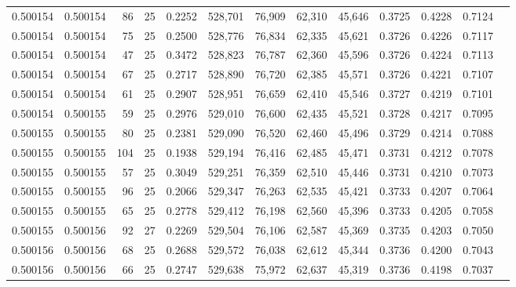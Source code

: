 \begin{tabular}{rrrrrrrrrrrrr}
0.500154 & 0.500154 &    86 &  25 &                                     0.2252 & 528,701 &  76,909 &  62,310 &  45,646 & 0.3725 & 0.4228 & 0.7124 \\
0.500154 & 0.500154 &    75 &  25 &                                     0.2500 & 528,776 &  76,834 &  62,335 &  45,621 & 0.3726 & 0.4226 & 0.7117 \\
0.500154 & 0.500154 &    47 &  25 &                                     0.3472 & 528,823 &  76,787 &  62,360 &  45,596 & 0.3726 & 0.4224 & 0.7113 \\
0.500154 & 0.500154 &    67 &  25 &                                     0.2717 & 528,890 &  76,720 &  62,385 &  45,571 & 0.3726 & 0.4221 & 0.7107 \\
0.500154 & 0.500154 &    61 &  25 &                                     0.2907 & 528,951 &  76,659 &  62,410 &  45,546 & 0.3727 & 0.4219 & 0.7101 \\
0.500154 & 0.500155 &    59 &  25 &                                     0.2976 & 529,010 &  76,600 &  62,435 &  45,521 & 0.3728 & 0.4217 & 0.7095 \\
0.500155 & 0.500155 &    80 &  25 &                                     0.2381 & 529,090 &  76,520 &  62,460 &  45,496 & 0.3729 & 0.4214 & 0.7088 \\
0.500155 & 0.500155 &   104 &  25 &                                     0.1938 & 529,194 &  76,416 &  62,485 &  45,471 & 0.3731 & 0.4212 & 0.7078 \\
0.500155 & 0.500155 &    57 &  25 &                                     0.3049 & 529,251 &  76,359 &  62,510 &  45,446 & 0.3731 & 0.4210 & 0.7073 \\
0.500155 & 0.500155 &    96 &  25 &                                     0.2066 & 529,347 &  76,263 &  62,535 &  45,421 & 0.3733 & 0.4207 & 0.7064 \\
0.500155 & 0.500155 &    65 &  25 &                                     0.2778 & 529,412 &  76,198 &  62,560 &  45,396 & 0.3733 & 0.4205 & 0.7058 \\
0.500155 & 0.500156 &    92 &  27 &                                     0.2269 & 529,504 &  76,106 &  62,587 &  45,369 & 0.3735 & 0.4203 & 0.7050 \\
0.500156 & 0.500156 &    68 &  25 &                                     0.2688 & 529,572 &  76,038 &  62,612 &  45,344 & 0.3736 & 0.4200 & 0.7043 \\
0.500156 & 0.500156 &    66 &  25 &                                     0.2747 & 529,638 &  75,972 &  62,637 &  45,319 & 0.3736 & 0.4198 & 0.7037 \\

\end{tabular}
